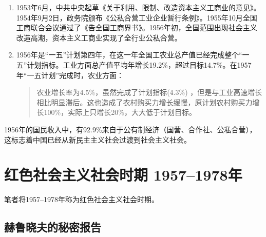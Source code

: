 \begin{enumerate}
\item 1953年6月，中共中央起草《关于利用、限制、改造资本主义工商业的意见》。1954年9月2日，政务院颁布《公私合营工业企业暂行条例》。1955年10月全国工商联合会议通过了《告全国工商界书》。1956年初，全国范围出现社会主义改造高潮，资本主义工商业实现了全行业公私合营。




\item 1956年是“一五”计划第四年，在这一年全国工农业总产值已经完成整个“一五”计划指标。工业方面总产值平均年增长19.2\%，超过目标14.7\%。在1957年“一五计划”完成时，农业方面：
  \begin{quotation}农业增长率为4.5\%，虽然完成了计划指标(4.3\%) ，但是与工业高速增长相比明显滞后。这也造成了农村购买力增长缓慢，原计划农村购买力增长100\%，实际上只增长20\%，大大低于计划目标。\cite{shiyiwu}
  \end{quotation}

\end{enumerate}

1956年的国民收入中，有92.9\%来自于公有制经济（国营、合作社、公私合营），这标志着中国已经从新民主主义社会过渡到社会主义社会。

\section{红色社会主义社会时期 1957--1978年}


笔者将1957--1978年称为红色社会主义社会时期。

\subsection{赫鲁晓夫的秘密报告}

